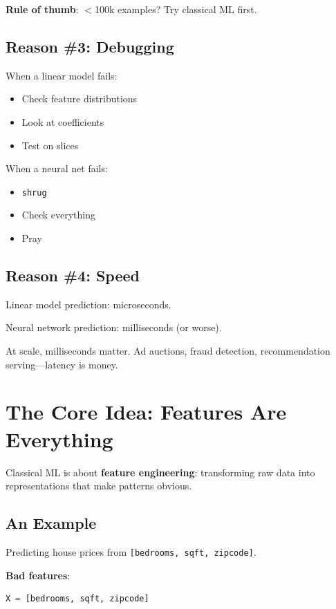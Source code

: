 \begin{asidebox}
\textbf{Rule of thumb}: $<$100k examples? Try classical ML first.
\end{asidebox}

\subsection{Reason \#3: Debugging}

When a linear model fails:
\begin{itemize}
    \item Check feature distributions
    \item Look at coefficients
    \item Test on slices
\end{itemize}

When a neural net fails:
\begin{itemize}
    \item \texttt{shrug}
    \item Check everything
    \item Pray
\end{itemize}

\subsection{Reason \#4: Speed}

Linear model prediction: microseconds.

Neural network prediction: milliseconds (or worse).

At scale, milliseconds matter. Ad auctions, fraud detection, recommendation serving—latency is money.

\section{The Core Idea: Features Are Everything}

Classical ML is about \textbf{feature engineering}: transforming raw data into representations that make patterns obvious.

\subsection{An Example}

Predicting house prices from \texttt{[bedrooms, sqft, zipcode]}.

\textbf{Bad features}:
\begin{lstlisting}[language=Python]
X = [bedrooms, sqft, zipcode]
\end{lstlisting}

